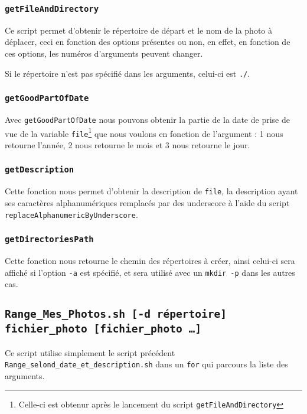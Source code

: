 \documentclass[a4paper, 11pt]{article}
\begin{document}
	\subsubsection{\texttt{getFileAndDirectory}}
	Ce script permet d'obtenir le répertoire de départ et le nom de la photo à déplacer, ceci en fonction des options présentes ou non, en effet, en fonction de
	ces options, les numéros d'arguments peuvent changer.
	
	Si le répertoire n'est pas spécifié dans les arguments, celui-ci est \texttt{./}.
	\subsubsection{\texttt{getGoodPartOfDate}}
	Avec \texttt{getGoodPartOfDate} nous pouvons obtenir la partie de la date de prise de vue de la variable \texttt{file}\footnote{Celle-ci est obtenur après le
	lancement du script \texttt{getFileAndDirectory}} que nous voulons en fonction de l'argument : 1 nous retourne l'année, 2 nous
	retourne le mois et 3 nous retourne le jour.
	\subsubsection{\texttt{getDescription}}
	Cette fonction nous permet d'obtenir la description de \texttt{file}, la description ayant ses caractères alphanumériques remplacés par des underscore à
	l'aide du script \texttt{replaceAlphanumericByUnderscore}.
	\subsubsection{\texttt{getDirectoriesPath}}
	Cette fonction nous retourne le chemin des répertoires à créer, ainsi celui-ci sera affiché si l'option \texttt{-a} est spécifié, et sera utilisé avec un
	\texttt{mkdir -p} dans les autres cas.
	

	
	\subsection{\texttt{Range\_Mes\_Photos.sh [-d répertoire] fichier\_photo [fichier\_photo \ldots]}}
	Ce script utilise simplement le script précédent \texttt{Range\_selond\_date\_et\_description.sh} dans un \texttt{for} qui parcours la liste des arguments.
	
\end{document}
